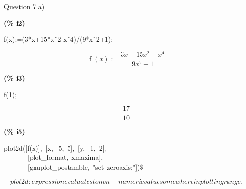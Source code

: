 \documentclass[fleqn]{article}
\begin{document}
Question 7
a)


\noindent
\begin{minipage}[t]{4.000000em}\color{red}\bfseries
(\% i2)	
\end{minipage}
\begin{minipage}[t]{\textwidth}\color{blue}
f(x):=(3*x+15*x\^\ {2}-x\^\ {4})/(9*x\^\ {2}+1);
\end{minipage}
\[\displaystyle \tag{\% o2} 
\mathop{f}(x)\mathop{:=}\frac{3 x\mathop{+}15 {{x}^{{2}}}\mathop{-}{{x}^{{4}}}}{9 {{x}^{{2}}}\mathop{+}1}\mbox{}
\]


\noindent
\begin{minipage}[t]{4.000000em}\color{red}\bfseries
(\% i3)	
\end{minipage}
\begin{minipage}[t]{\textwidth}\color{blue}
f(1);
\end{minipage}
\[\displaystyle \tag{\% o3} 
\frac{17}{10}\mbox{}
\]


\noindent
\begin{minipage}[t]{4.000000em}\color{red}\bfseries
(\% i5)	
\end{minipage}
\begin{minipage}[t]{\textwidth}\color{blue}
plot2d([f(x)],\ [x,\ -5,\ 5],\ [y,\ -1,\ 2],\ \\
\ \ \ \ \ \ \ [plot\_format,\ xmaxima],\ \\
\ \ \ \ \ \ \ [gnuplot\_postamble,\ "set\ zeroaxis;"])\$
\end{minipage}
\[\displaystyle plot2d: expression evaluates to non-numeric value somewhere in plotting range.\mbox{}
\]
\end{document}
